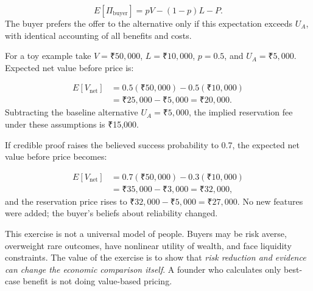 \begin{equation}
E[\Pi_{\text{buyer}}] = pV - (1-p)L - P.
\end{equation}
The buyer prefers the offer to the alternative only if this expectation exceeds $U_A$, with identical accounting of all benefits and costs.

For a toy example take $V = \text{₹}50{,}000$, $L = \text{₹}10{,}000$, $p = 0.5$, and $U_A = \text{₹}5{,}000$. Expected net value before price is:

\begin{equation}
\begin{aligned}
E[V_{\text{net}}] &= 0.5(₹50{,}000) - 0.5(₹10{,}000) \\
&= ₹25{,}000 - ₹5{,}000 = \text{₹}20{,}000.
\end{aligned}
\end{equation}
Subtracting the baseline alternative $U_A = \text{₹}5{,}000$, the implied reservation fee under these assumptions is ₹15,000.

If credible proof raises the believed success probability to 0.7, the expected net value before price becomes:

\begin{equation}
\begin{aligned}
E[V_{\text{net}}] &= 0.7(₹50{,}000) - 0.3(₹10{,}000) \\
&= ₹35{,}000 - ₹3{,}000 = \text{₹}32{,}000,
\end{aligned}
\end{equation}
and the reservation price rises to $₹32{,}000 - ₹5{,}000 = \text{₹}27{,}000$. No new features were added; the buyer's beliefs about reliability changed.

This exercise is not a universal model of people. Buyers may be risk averse, overweight rare outcomes, have nonlinear utility of wealth, and face liquidity constraints. The value of the exercise is to show that \emph{risk reduction and evidence can change the economic comparison itself}. A founder who calculates only best-case benefit is not doing value-based pricing.
